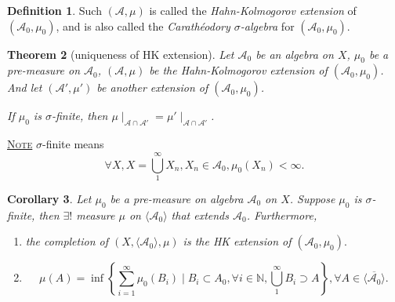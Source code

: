 \documentclass{report}
\newcommand{\N}{\mathbb{N}}
\newcommand{\fancyem}[1]{\underline{\textsc{#1}}}
\newtheorem{theorem}{Theorem}[chapter]
\newtheorem{corollary}[theorem]{Corollary}
\theoremstyle{definition}
\newtheorem{definition}[theorem]{Definition}
\theoremstyle{remark}
\begin{document}
\begin{definition}
Such $(\mathcal{A}, \mu)$ is called the \emph{Hahn-Kolmogorov extension} of $(\mathcal{A}_0, \mu_0)$, and is also called the \emph{Carathéodory $\sigma$-algebra} for $(\mathcal{A}_0, \mu_0)$.
\end{definition}

\begin{theorem}[uniqueness of HK extension]\label{th:hkunique}
Let $\mathcal{A}_0$ be an algebra on $X$, $\mu_0$ be a pre-measure on $\mathcal{A}_0$, $(\mathcal{A}, \mu)$ be the Hahn-Kolmogorov extension of $(\mathcal{A}_0, \mu_0)$.
And let $(\mathcal{A}', \mu')$ be another extension of $(\mathcal{A}_0, \mu_0)$.

If $\mu_0$ is \emph{$\sigma$-finite}, then $\mu \mid_{\mathcal{A} \cap \mathcal{A}'} = \mu' \mid_{\mathcal{A} \cap \mathcal{A}'}$.
\end{theorem}

\fancyem{Note} $\sigma$-finite means
\[\forall X, X = \bigcup_1^\infty X_n, X_n \in \mathcal{A}_0, \mu_0(X_n) < \infty.\]

\begin{corollary}
Let $\mu_0$ be a pre-measure on algebra $\mathcal{A}_0$ on $X$. Suppose $\mu_0$ is $\sigma$-finite, then $\exists!$ measure $\mu$ on $\langle \mathcal{A}_0 \rangle$ that extends $\mathcal{A}_0$. Furthermore, 
\begin{enumerate}
\item the completion of $(X, \langle \mathcal{A}_0 \rangle, \mu)$ is the HK extension of $(\mathcal{A}_0, \mu_0).$
\item 
\[
\mu(A) = \inf \left\{\sum_{i=1}^\infty \mu_0(B_i) \mid B_i \subset A_0, \forall i \in \N, \bigcup_1^\infty B_i \supset A\right\}, \forall A \in \overline{\langle \mathcal{A}_0\rangle}.
\]
\end{enumerate}
\end{corollary}
\end{document}
